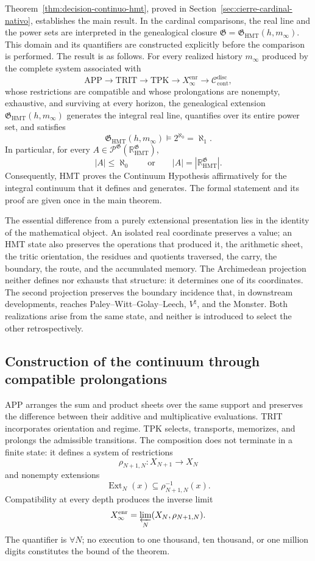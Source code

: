 Theorem~\ref{thm:decision-continuo-hmt}, proved in
Section~\ref{sec:cierre-cardinal-nativo}, establishes the main result. In the
cardinal comparisons, the real line and the power sets are interpreted in the
genealogical closure
\(\mathfrak G=\mathfrak G_{\mathrm{HMT}}(h,m_\infty)\). This domain and its
quantifiers are constructed explicitly before the comparison is performed.
The result is as follows. For every realized history \(m_\infty\) produced by
the complete system associated with
\[
 \mathrm{APP}\longrightarrow\mathrm{TRIT}\longrightarrow\mathrm{TPK}
 \longrightarrow X_\infty^{\mathrm{enr}}
 \longrightarrow\mathcal C_{\mathrm{cont}}^{\mathrm{disc}},
\]
whose restrictions are compatible and whose prolongations are nonempty,
exhaustive, and surviving at every horizon, the genealogical extension
\(\mathfrak G_{\mathrm{HMT}}(h,m_\infty)\) generates the integral real line,
quantifies over its entire power set, and satisfies
\[
 \mathfrak G_{\mathrm{HMT}}(h,m_\infty)
 \models 2^{\aleph_0}=\aleph_1.
\]
In particular, for every
\(A\in\mathcal P^{\mathfrak G}(\mathbb R_{\mathrm{HMT}}^{\mathfrak G})\),
\[
 |A|\leq\aleph_0
 \qquad\text{or}\qquad
 |A|=|\mathbb R_{\mathrm{HMT}}^{\mathfrak G}|.
\]
Consequently, HMT proves the Continuum Hypothesis affirmatively for the
integral continuum that it defines and generates. The formal statement and
its proof are given once in the main theorem.

The essential difference from a purely extensional presentation lies in the
identity of the mathematical object. An isolated real coordinate preserves a
value; an HMT state also preserves the operations that produced it, the
arithmetic sheet, the tritic orientation, the residues and quotients traversed,
the carry, the boundary, the route, and the accumulated memory. The
Archimedean projection neither defines nor exhausts that structure: it
determines one of its coordinates. The second projection preserves the boundary
incidence that, in downstream developments, reaches
Paley--Witt--Golay--Leech, \(V^\natural\), and the Monster. Both realizations
arise from the same state, and neither is introduced to select the other
retrospectively.

\subsection{Construction of the continuum through compatible prolongations}

APP arranges the sum and product sheets over the same support and preserves
the difference between their additive and multiplicative evaluations. TRIT incorporates orientation and
regime. TPK selects, transports, memorizes, and prolongs the admissible
transitions. The composition does not terminate in a finite state: it defines
a system of restrictions
\[
 \rho_{N+1,N}:X_{N+1}\longrightarrow X_N
\]
and nonempty extensions
\[
 \operatorname{Ext}_N(x)\subseteq\rho_{N+1,N}^{-1}(x).
\]
Compatibility at every depth produces the inverse limit
\[
 X_\infty^{\mathrm{enr}}
 =\varprojlim_N(X_N,\rho_{N+1,N}).
\]
The quantifier is \(\forall N\); no execution to one thousand, ten thousand,
or one million digits constitutes the bound of the theorem.

